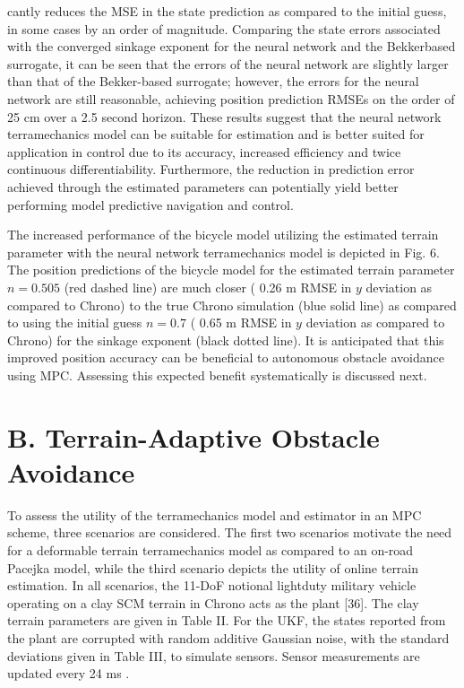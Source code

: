 \documentclass[10pt]{article}
\begin{document}
cantly reduces the MSE in the state prediction as compared to the initial guess, in some cases by an order of magnitude. Comparing the state errors associated with the converged sinkage exponent for the neural network and the Bekkerbased surrogate, it can be seen that the errors of the neural network are slightly larger than that of the Bekker-based surrogate; however, the errors for the neural network are still reasonable, achieving position prediction RMSEs on the order of 25 cm over a 2.5 second horizon. These results suggest that the neural network terramechanics model can be suitable for estimation and is better suited for application in control due to its accuracy, increased efficiency and twice continuous differentiability. Furthermore, the reduction in prediction error achieved through the estimated parameters can potentially yield better performing model predictive navigation and control.

The increased performance of the bicycle model utilizing the estimated terrain parameter with the neural network terramechanics model is depicted in Fig. 6. The position predictions of the bicycle model for the estimated terrain parameter $n=0.505$ (red dashed line) are much closer ( 0.26 m RMSE in $y$ deviation as compared to Chrono) to the true Chrono simulation (blue solid line) as compared to using the initial guess $n=0.7$ ( 0.65 m RMSE in $y$ deviation as compared to Chrono) for the sinkage exponent (black dotted line). It is anticipated that this improved position accuracy can be beneficial to autonomous obstacle avoidance using MPC. Assessing this expected benefit systematically is discussed next.

\section*{B. Terrain-Adaptive Obstacle Avoidance}
To assess the utility of the terramechanics model and estimator in an MPC scheme, three scenarios are considered. The first two scenarios motivate the need for a deformable terrain terramechanics model as compared to an on-road Pacejka model, while the third scenario depicts the utility of online terrain estimation. In all scenarios, the 11-DoF notional lightduty military vehicle operating on a clay SCM terrain in Chrono acts as the plant [36]. The clay terrain parameters are given in Table II. For the UKF, the states reported from the plant are corrupted with random additive Gaussian noise, with the standard deviations given in Table III, to simulate sensors. Sensor measurements are updated every 24 ms .
\end{document}
